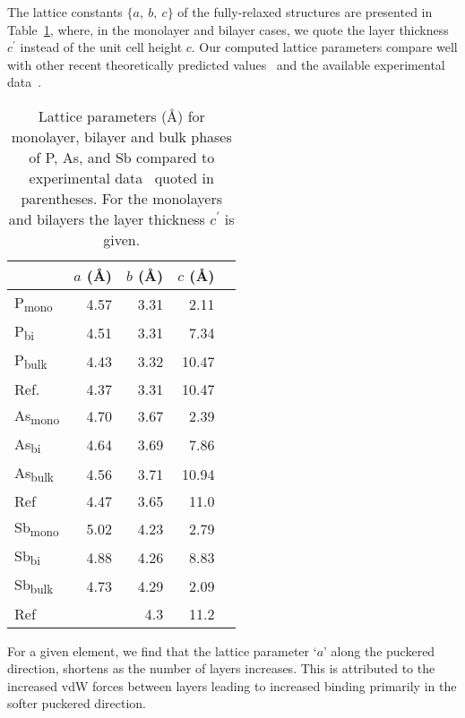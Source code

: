 The lattice constants $\{a,\ b,\ c\}$ 
of the fully-relaxed structures 
are presented in Table~\ref{table:lattice_consts}, 
where, in the monolayer and bilayer cases,  
we quote the layer thickness $c^\prime$ 
instead of the unit cell height $c$.
%
Our computed lattice parameters  compare well 
with other recent theoretically predicted values~\cite{PhysRevB.92.064114,PhysRevB.86.035105,PhysRevB.94.205410,PhysRevB.91.085423,1882-0786-8-5-055201,doi:10.1021/acsami.5b02441,ANDP:ANDP201600152,Lu2016}
and the available experimental data~\cite{doi:10.1063/1.438523,doi:10.1080/14786437508229285}.
%
\begin{table}[th!]
\centering
\begin{tabular}{lrrrr}
\hline\hline
&$a$ (\AA) &$b$ (\AA)&$c$ (\AA)\\
\hline
P\textsubscript{mono}	&4.57	&3.31	&2.11\\
P\textsubscript{bi}		&4.51	&3.31 	&7.34\\
P\textsubscript{bulk} 		&4.43	&3.32	&10.47\\
Ref.\cite{doi:10.1063/1.438523}&4.37& 3.31 	&10.47 \\
\hline
As\textsubscript{mono}	&4.70	&3.67	&2.39\\
As\textsubscript{bi}		&4.64	&3.69	&7.86\\
As\textsubscript{bulk} 	&4.56	&3.71	&10.94\\
Ref~\cite{doi:10.1080/14786437508229285}&4.47&3.65&11.0\\
\hline
Sb\textsubscript{mono}	&5.02	&4.23	&2.79\\
Sb\textsubscript{bi}		&4.88	&4.26	&8.83&\\
Sb\textsubscript{bulk} 	&4.73	&4.29	&2.09 \\
Ref~\cite{Barrett:a03833}	&		&4.3		&11.2\\
\hline\hline
\end{tabular}
\caption{
Lattice parameters (\AA)  for monolayer, bilayer and bulk phases of P, As, and Sb 
compared to experimental data~\cite{doi:10.1063/1.438523,doi:10.1080/14786437508229285,Barrett:a03833} quoted in parentheses. 
For the monolayers and bilayers the layer thickness $c^\prime$ is given.
}
\label{table:lattice_consts}
\end{table}

For a given element, 
we find that the lattice parameter `$a$' 
along the puckered direction, 
shortens as the number of layers increases.
%
This is attributed to the increased 
vdW forces between layers 
leading to increased binding primarily 
in the softer puckered direction.

